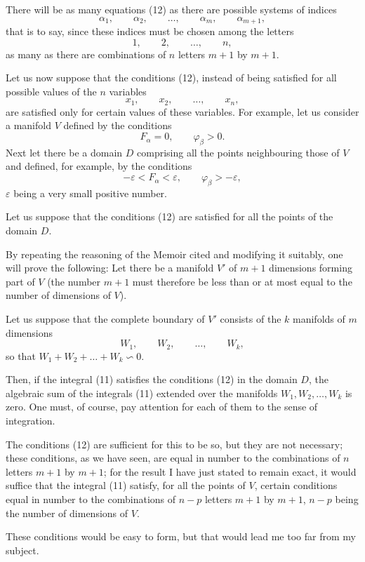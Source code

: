 \documentclass{article}
\begin{document}
There will be as many equations (12) as there are possible systems of indices
\[
\alpha_{1}, \qquad \alpha_{2}, \qquad \ldots, \qquad \alpha_{m}, \qquad \alpha_{m+1},
\]
that is to say, since these indices must be chosen among the letters
\[
1, \qquad 2, \qquad \ldots, \qquad n,
\]
as many as there are combinations of $n$ letters $m + 1$ by $m + 1$.

Let us now suppose that the conditions (12), instead of being satisfied for all possible values of the $n$ variables
\[
x_{1}, \qquad x_{2}, \qquad \ldots, \qquad x_{n},
\]
are satisfied only for certain values of these variables. For example, let us consider a manifold $V$ defined by the conditions
\[
F_{\alpha} = 0, \qquad \varphi_{\beta} > 0.
\]
Next let there be a domain $D$ comprising all the points neighbouring those of $V$ and defined, for example, by the conditions
\[
-\varepsilon < F_{\alpha} < \varepsilon, \qquad \varphi_{\beta} > -\varepsilon,
\]
$\varepsilon$ being a very small positive number.

Let us suppose that the conditions (12) are satisfied for all the points of the domain $D$.

By repeating the reasoning of the Memoir cited and modifying it suitably, one will prove the following: Let there be a manifold $V'$ of $m + 1$ dimensions forming part of $V$ (the number $m + 1$ must therefore be less than or at most equal to the number of dimensions of $V$).

Let us suppose that the complete boundary of $V'$ consists of the $k$ manifolds of $m$ dimensions
\[
W_{1}, \qquad W_{2}, \qquad \ldots, \qquad W_{k},
\]
so that $W_{1} + W_{2} + \ldots + W_{k} \backsim 0$.

Then, if the integral (11) satisfies the conditions (12) in the domain $D$, the algebraic sum of the integrals (11) extended over the manifolds $W_{1}, W_{2}, \ldots, W_{k}$ is zero. One must, of course, pay attention for each of them to the sense of integration.

The conditions (12) are sufficient for this to be so, but they are not necessary; these conditions, as we have seen, are equal in number to the combinations of $n$ letters $m + 1$ by $m + 1$; for the result I have just stated to remain exact, it would suffice that the integral (11) satisfy, for all the points of $V$, certain conditions equal in number to the combinations of $n - p$ letters $m + 1$ by $m + 1$, $n - p$ being the number of dimensions of $V$.

These conditions would be easy to form, but that would lead me too far from my subject.
\end{document}
